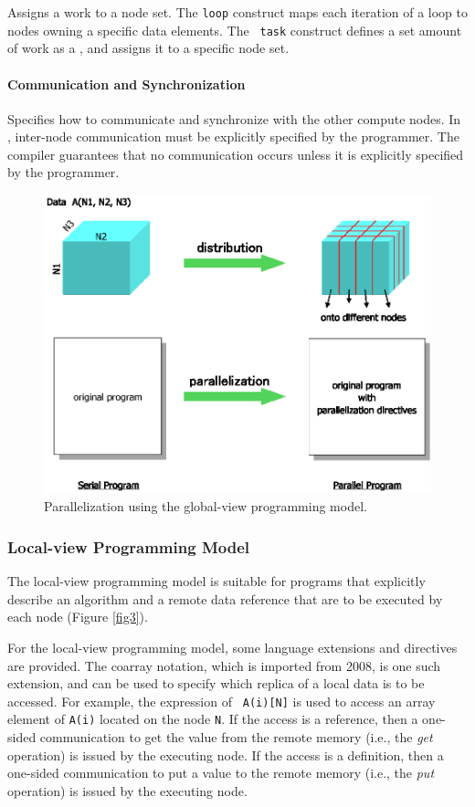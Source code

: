 Assigns a work to a node set. The {\tt loop} construct maps each
iteration of a loop to nodes owning a specific data elements. The {\tt
task} construct defines a set amount of work as a {\it {}}, and
assigns it to a specific node set.

\paragraph{Communication and Synchronization}

Specifies how to communicate and synchronize with the other compute
nodes. In {\XMP}, inter-node communication must be explicitly specified
by the programmer. The compiler guarantees that no communication occurs
unless it is explicitly specified by the programmer.

\begin{figure}
  \centering
  \includegraphics[width=12cm]{figs/Fig2.eps}
  \caption{Parallelization using the global-view programming model.}
\label{fig2}
\end{figure}


\subsubsection{Local-view Programming Model}

The local-view programming model is suitable for programs that
explicitly describe an algorithm and a remote data reference that are to
be executed by each node (Figure \ref{fig3}).

For the local-view programming model, some language extensions and 
directives are provided. The coarray notation, which is imported from
{\Fort} 2008,
is one such extension, and can be used to specify which replica of a
local data is to be accessed. For example, the expression of {\tt
A(i)[N]} is used to access an array element of {\tt A(i)} located on the
node {\tt N}.
%
If the access is a reference, then a one-sided communication to get the
value from the remote memory (i.e., the {\it get} operation) is issued
by the executing node.
If the access is a definition, then a one-sided communication to put a
value to the remote memory (i.e., the {\it put} operation) is issued by
the executing node.

